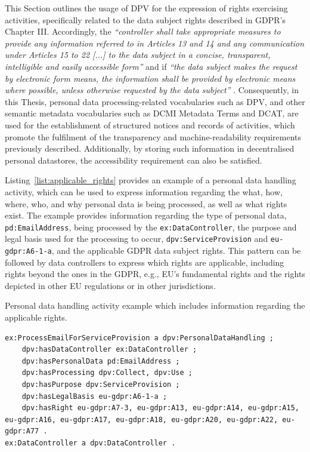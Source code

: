 This Section outlines the usage of DPV for the expression of rights exercising activities, specifically related to the data subject rights described in GDPR's Chapter III.
Accordingly, the \textit{``controller shall take appropriate measures to provide any information referred to in Articles 13 and 14 and any communication under Articles 15 to 22 [...] to the data subject in a concise, transparent, intelligible and easily accessible form''} and if \textit{``the data subject makes the request by electronic form means, the information shall be provided by electronic means where possible, unless otherwise requested by the data subject''} \citeyearpar{noauthor_regulation_2016}.
Consequently, in this Thesis, personal data processing-related vocabularies such as DPV, and other semantic metadata vocabularies such as DCMI Metadata Terms and DCAT, are used for the establishment of structured notices and records of activities, which promote the fulfilment of the transparency and machine-readability requirements previously described.
Additionally, by storing such information in decentralised personal datastores, the accessibility requirement can also be satisfied.

Listing~\ref{list:applicable_rights} provides an example of a personal data handling activity, which can be used to express information regarding the what, how, where, who, and why personal data is being processed, as well as what rights exist.
The example provides information regarding the type of personal data, \texttt{pd:EmailAddress}, being processed by the \texttt{ex:DataController}, the purpose and legal basis used for the processing to occur, \texttt{dpv:ServiceProvision} and \texttt{eu-gdpr:A6-1-a}, and the applicable GDPR data subject rights.
This pattern can be followed by data controllers to express which rights are applicable, including rights beyond the ones in the GDPR, e.g., EU's fundamental rights and the rights depicted in other EU regulations or in other jurisdictions.

\begin{listing}[htp]
\caption{Personal data handling activity example which includes information regarding the applicable rights.}
\label{list:applicable_rights}
\begin{verbatim}
ex:ProcessEmailForServiceProvision a dpv:PersonalDataHandling ;
    dpv:hasDataController ex:DataController ;
    dpv:hasPersonalData pd:EmailAddress ;
    dpv:hasProcessing dpv:Collect, dpv:Use ;
    dpv:hasPurpose dpv:ServiceProvision ;
    dpv:hasLegalBasis eu-gdpr:A6-1-a ;
    dpv:hasRight eu-gdpr:A7-3, eu-gdpr:A13, eu-gdpr:A14, eu-gdpr:A15, eu-gdpr:A16, eu-gdpr:A17, eu-gdpr:A18, eu-gdpr:A20, eu-gdpr:A22, eu-gdpr:A77 .
ex:DataController a dpv:DataController .
\end{verbatim}
\end{listing}

